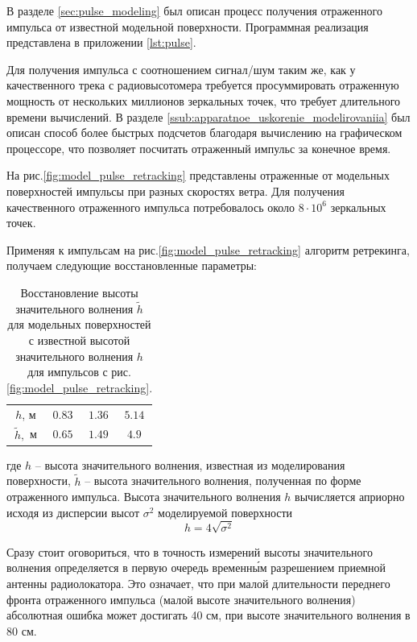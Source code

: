 В разделе \ref{sec:pulse_modeling} был описан процесс получения отраженного
импульса от известной модельной поверхности. 
Программная реализация
представлена в приложении \ref{lst:pulse}. 

Для получения импульса с соотношением сигнал/шум  таким же, как у качественного
трека с радиовысотомера требуется просуммировать отраженную мощность от
нескольких миллионов зеркальных точек, что требует длительного времени
вычислений. В разделе \ref{ssub:apparatnoe_uskorenie_modelirovaniia} был описан
способ более быстрых подсчетов благодаря вычислению на графическом процессоре,
что позволяет посчитать отраженный импульс за конечное время. 

На рис.\ref{fig:model_pulse_retracking} представлены отраженные от модельных
поверхностей импульсы при разных скоростях ветра. Для получения качественного
отраженного импульса потребовалось около $8\cdot 10^{6}$ зеркальных точек.

Применяя к импульсам на рис.\ref{fig:model_pulse_retracking} алгоритм
ретрекинга, получаем следующие восстановленные параметры:
\begin{table}[h]
    \centering
    \caption{Восстановление высоты значительного волнения $\tilde h$ для модельных
    поверхностей с известной высотой значительного волнения $h$ для импульсов с
рис. \ref{fig:model_pulse_retracking}.}
    \label{tab:model}
        \begin{tabular}{|c|c|c|c|}
            \hline
            $h$, м      & $0.83$ & $1.36$ & $5.14$\\
            $\tilde h,$ м & $0.65$ & $1.49$ & $4.9$\\
            \hline
        \end{tabular}
\end{table}

где $h$ -- высота значительного волнения, известная из моделирования
поверхности, $\tilde h$ -- высота значительного волнения, полученная по форме
отраженного импульса. Высота значительного волнения $h$ вычисляется
априорно исходя из дисперсии высот $\sigma^2$ моделируемой поверхности \cite{waves} 
\begin{equation}
    h = 4 \sqrt{\sigma^2}
\end{equation}

Сразу стоит оговориться, что в точность измерений высоты
значительного волнения определяется в первую очередь временн\'{ы}м разрешением
приемной антенны радиолокатора. Это означает, что при малой длительности
переднего фронта отраженного импульса
(малой высоте значительного волнения) абсолютная ошибка может достигать 40 см, при высоте значительного волнения в 80 см. 

